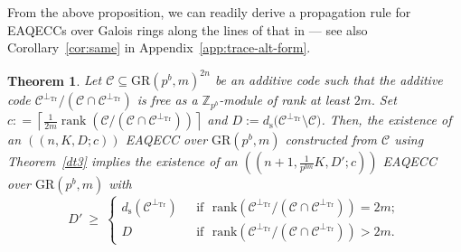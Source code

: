 \documentclass{article}
\DeclareMathOperator{\Tr}{Tr}
\DeclareMathOperator{\rank}{rank}
\newtheorem{thm}{Theorem}[section]
\theoremstyle{remark}
\theoremstyle{definition}
\numberwithin{equation}{section}
\begin{document}
From the above proposition, we can readily derive a propagation rule for EAQECCs over Galois rings along the lines of that in \cite[Theorem~16]{luo1} --- see also Corollary~\ref{cor:same} in Appendix~\ref{app:trace-alt-form}. 

\begin{thm}\label{thm:same} 
 Let $\mathcal{C} \subseteq \text{GR}(p^b,m)^{2n}$ be an additive code such that the additive code $\mathcal{C}^{\perp_{\Tr}}/(\mathcal{C}  \cap  \mathcal{C}^{\perp_{\Tr}})$ is free as a $\mathbb{Z}_{p^b}$-module of rank at least  $2m.$ Set $c : = \left\lceil\frac{1}{2m}\rank(\mathcal{C}/(\mathcal{C} \cap \mathcal{C}^{\perp_{\Tr}}))\right\rceil$ and $D := d_{\mathrm{s}}\bigl({\mathcal{C}}^{\perp_{\Tr}} \setminus \mathcal{C}\bigr)$.  Then, the existence of an $((n,K,D;c))$ EAQECC over $\text{GR}(p^b,m)$ constructed from $\mathcal{C}$ using Theorem~\ref{dt3} implies the existence of an $((n+1,\frac{1}{p^{bm}}K,D';c))$ EAQECC  over  $\text{GR}(p^b,m)$ with 
 \begin{equation*}
D'~\geq ~\left\{\begin{array}{ll}
d_{\mathrm{s}}(\mathcal{C}^{\perp_{\Tr}})  & \text{~~if~~}  \text{rank} (\mathcal{C}^{\perp_{\Tr}}/(\mathcal{C}  \cap  \mathcal{C}^{\perp_{\Tr}})) =2m; \\
D   & \text{~~if~~} \text{rank} (\mathcal{C}^{\perp_{\Tr}}/(\mathcal{C}  \cap  \mathcal{C}^{\perp_{\Tr}})) >2m.\,
\end{array}\right.
\end{equation*}

\end{thm}
\end{document}
